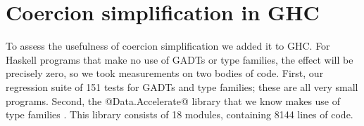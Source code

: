 \documentclass[a4paper,UKenglish]{lipics}
\makeatletter
\newcommand{\highlight}[1]{\colorbox{green}{\ensuremath{#1}}}
\def\rulename#1{\textsc{#1}}
\def\rulename#1{\textsc{#1}}
\newcommand{\sym}[1]{\mathop{sym}\, #1}
\newcommand{\nth}[2]{\mathop{nth} #1\;#2}
\newcommand{\inst}[2]{#1@#2}
\newcommand{\refl}[1]{\langle#1\rangle}  %
\newcommand{\rsa}[1]{\rightsquigarrow_{#1}}
\makeatother
\begin{document}

\section{Coercion simplification in GHC}\label{ssect:ghc}

To assess the usefulness of coercion simplification we added it to GHC. 
For Haskell programs that make no use of GADTs or type families, the
effect will be precisely zero, so we took measurements on two bodies of code.
First, our regression suite of 151 tests for GADTs and type families; these are
all very small programs.  Second, the @Data.Accelerate@ library that we know makes use
of type families \cite{chakravarty+:accelerate}. This library consists
of 18 modules, containing 8144 lines of code.
\end{document}
